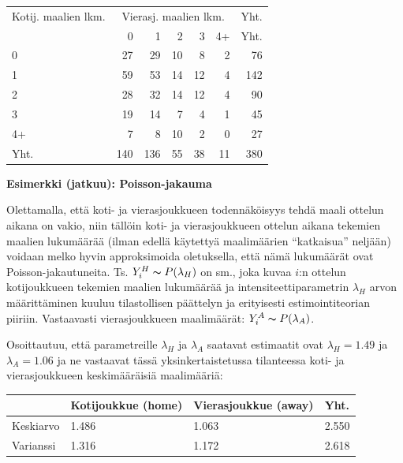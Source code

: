 \documentclass[
]{book}
\begin{document}
\begin{tabular}{lrrrrrr}
\toprule
\multicolumn{1}{c}{Kotij. maalien lkm.} & \multicolumn{5}{c}{Vierasj. maalien lkm.} & \multicolumn{1}{c}{Yht.} \\
\cmidrule(l{3pt}r{3pt}){1-1} \cmidrule(l{3pt}r{3pt}){2-6} \cmidrule(l{3pt}r{3pt}){7-7}
  & 0 & 1 & 2 & 3 & 4+ & Yht.\\
\midrule
0 & 27 & 29 & 10 & 8 & 2 & 76\\
1 & 59 & 53 & 14 & 12 & 4 & 142\\
2 & 28 & 32 & 14 & 12 & 4 & 90\\
3 & 19 & 14 & 7 & 4 & 1 & 45\\
4+ & 7 & 8 & 10 & 2 & 0 & 27\\
\addlinespace
Yht. & 140 & 136 & 55 & 38 & 11 & 380\\
\bottomrule
\end{tabular}

\begin{eblock}{}
\textbf{Esimerkki (jatkuu): Poisson-jakauma}

Olettamalla, että koti- ja vierasjoukkueen todennäköisyys tehdä maali ottelun aikana on vakio, niin tällöin koti- ja vierasjoukkueen ottelun aikana tekemien maalien lukumäärää (ilman edellä käytettyä maalimäärien ``katkaisua'' neljään) voidaan melko hyvin approksimoida oletuksella, että nämä lukumäärät ovat Poisson-jakautuneita. Ts. \(Y^H_i \thicksim P(\lambda_H)\) on sm., joka kuvaa \(i\):n ottelun kotijoukkueen tekemien maalien lukumäärää ja intensiteettiparametrin \(\lambda_H\) arvon määrittäminen kuuluu tilastollisen päättelyn ja erityisesti estimointiteorian piiriin. Vastaavasti vierasjoukkueen maalimäärät: \(Y^A_i \thicksim P(\lambda_A)\).

Osoittautuu, että parametreille \(\lambda_H\) ja \(\lambda_A\) saatavat estimaatit ovat \(\lambda_H = 1.49\) ja \(\lambda_A = 1.06\) ja ne vastaavat tässä yksinkertaistetussa tilanteessa koti- ja vierasjoukkueen keskimääräisiä maalimääriä:

\end{eblock}

\FloatBarrier

\begin{tabular}{llll}
\toprule
  & Kotijoukkue (home) & Vierasjoukkue (away) & Yht.\\
\midrule
Keskiarvo & 1.486 & 1.063 & 2.550\\
Varianssi & 1.316 & 1.172 & 2.618\\
\bottomrule
\end{tabular}
\end{document}
